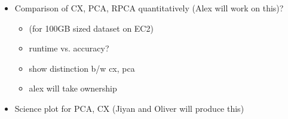 \begin{itemize}
\begin{itemize}
  \end{itemize}
 \item Comparison of CX, PCA, RPCA quantitatively (Alex will work on this)? 
  \begin{itemize}
    \item (for 100GB sized dataset on EC2)
    \item runtime vs. accuracy?
    \item show distinction b/w cx, pca
    \item alex will take ownership
  \end{itemize}

 \item Science plot for PCA, CX (Jiyan and Oliver will produce this)
\end{itemize}

